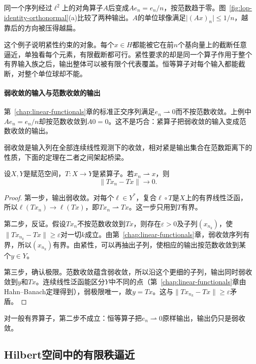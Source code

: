 同一个序列经过$\ell^2$上的对角算子$A$后变成$Ae_n=e_n/n$，按范数趋于零。图~\ref{fig:lop-identity-orthonormal}(a)比较了两种输出。$A$的单位球像满足$\lvert(Ax)_n\rvert\leq1/n$，越靠后的方向被压得越扁。

这个例子说明紧性约束的对象。每个$x\in H$都能被它在前$n$个基向量上的截断任意逼近，单独看每个元素，有限截断都可行。紧性要求的却是同一个算子作用于整个有界输入族之后，输出整体可以被有限个代表覆盖。恒等算子对每个输入都能截断，对整个单位球却不能。

\paragraph{弱收敛的输入与范数收敛的输出}
第~\ref{chap:linear-functionals}章的标准正交序列满足$e_n\rightharpoonup0$而不按范数收敛。上例中$Ae_n=e_n/n$却按范数收敛到$A0=0$。这不是巧合：紧算子把弱收敛的输入变成范数收敛的输出。

弱收敛是输入列在全部连续线性观测下的收敛，相对紧是输出集合在范数距离下的性质，下面的定理在二者之间架起桥梁。

\begin{theorem}[紧算子改善收敛]
\label{thm:lop-compact-weak-strong}
设$X,Y$是赋范空间，$T:X\to Y$是紧算子。若$x_n\rightharpoonup x$，则
\begin{equation}
 \lVert Tx_n-Tx\rVert\to0.
 \label{eq:lop-compact-weak-strong}
\end{equation}
\end{theorem}

\begin{proof}
第一步，输出弱收敛。对每个$\ell\in Y^*$，复合$\ell\circ T$是$X$上的有界线性泛函，所以$\ell(Tx_n)\to\ell(Tx)$，即$Tx_n\rightharpoonup Tx$。这一步只用到$T$有界。

第二步，反证。假设$Tx_n$不按范数收敛到$Tx$，则存在$\varepsilon>0$及子列$(x_{n_k})$，使$\lVert Tx_{n_k}-Tx\rVert\geq\varepsilon$对一切$k$成立。由第~\ref{chap:linear-functionals}章，弱收敛序列有界，所以$(x_{n_k})$有界。由紧性，可以再抽出子列，使相应的输出按范数收敛到某个$y\in Y$。

第三步，确认极限。范数收敛蕴含弱收敛，所以沿这个更细的子列，输出同时弱收敛到$y$和$Tx$。连续线性泛函能区分$Y$中不同的点（第~\ref{chap:linear-functionals}章由Hahn--Banach定理得到），弱极限唯一，故$y=Tx$。这与$\lVert Tx_{n_k}-Tx\rVert\geq\varepsilon$矛盾。
\end{proof}

对一般有界算子，第二步不成立：恒等算子把$e_n\rightharpoonup0$原样输出，输出仍只是弱收敛。

\subsection{Hilbert空间中的有限秩逼近}
\label{sec:lop-finite-rank-approx}

